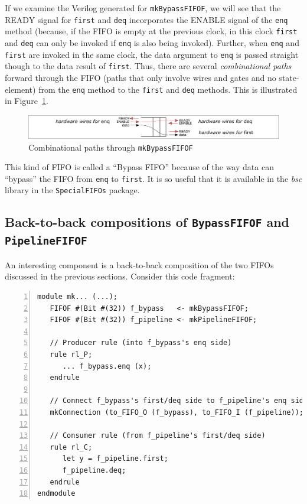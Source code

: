 If we examine the Verilog generated for \verb|mkBypassFIFOF|, we will
see that the READY signal for \verb|first| and \verb|deq| incorporates
the ENABLE signal of the \verb|enq| method (because, if the FIFO is
empty at the previous clock, in this clock \verb|first| and \verb|deq|
can only be invoked if \verb|enq| is also being invoked).  Further,
when \verb|enq| and \verb|first| are invoked in the same clock, the
data argument to \verb|enq| is passed straight though to the data
result of \verb|first|.  Thus, there are several \emph{combinational
paths} forward through the FIFO (paths that only involve wires and
gates and no state-element) from the \verb|enq| method to the
\verb|first| and \verb|deq| methods.
This is illustrated in
Figure~\ref{Fig_Combo_path_in_mkBypassFIFOF}.
\begin{figure}[htbp]
  \centerline{\includegraphics[width=6in,angle=0]{Figures/Fig_Combo_path_in_mkBypassFIFOF}}
  \caption{\label{Fig_Combo_path_in_mkBypassFIFOF}
           Combinational paths through {\tt mkBypassFIFOF}}
\end{figure}

This kind of FIFO is called a ``Bypass FIFO'' because of the way data
can ``bypass'' the FIFO from \verb|enq| to \verb|first|.  It is so
useful that it is available in the \emph{bsc} library in the
\verb|SpecialFIFOs| package.


\subsection{Back-to-back compositions of {\tt BypassFIFOF} and {\tt PipelineFIFOF}}

\label{Sec_mkBypassFIFOF_mkPipelineFIFOF}

An interesting component is a back-to-back composition of the two
FIFOs discussed in the previous sections.  Consider this code
fragment:

{\footnotesize
\begin{Verbatim}[frame=single, numbers=left]
module mk... (...);
   FIFOF #(Bit #(32)) f_bypass   <- mkBypassFIFOF;
   FIFOF #(Bit #(32)) f_pipeline <- mkPipelineFIFOF;

   // Producer rule (into f_bypass's enq side)
   rule rl_P;
      ... f_bypass.enq (x);
   endrule

   // Connect f_bypass's first/deq side to f_pipeline's enq side
   mkConnection (to_FIFO_O (f_bypass), to_FIFO_I (f_pipeline));

   // Consumer rule (from f_pipeline's first/deq side)
   rule rl_C;
      let y = f_pipeline.first;
      f_pipeline.deq;
   endrule
endmodule
\end{Verbatim}
}

